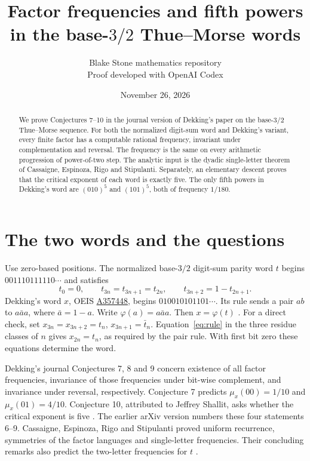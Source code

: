 \documentclass[11pt]{article}
\title{Factor frequencies and fifth powers in the base-$3/2$ Thue--Morse words}
\author{Blake Stone mathematics repository\\[-2pt]\small Proof developed with OpenAI Codex}
\date{November 26, 2026}
\begin{document}
\maketitle
\begin{abstract}
We prove Conjectures 7--10 in the journal version of Dekking's paper on the base-$3/2$
Thue--Morse sequence. For both the normalized digit-sum word and Dekking's variant, every
finite factor has a computable rational frequency, invariant under complementation and
reversal. The frequency is the same on every arithmetic progression of power-of-two step.
The analytic input is the dyadic single-letter theorem of Cassaigne, Espinoza, Rigo and
Stipulanti. Separately, an elementary descent proves that the critical exponent of each
word is exactly five. The only fifth powers in Dekking's word are $(010)^5$ and $(101)^5$,
both of frequency $1/180$.
\end{abstract}

\section{The two words and the questions}
Use zero-based positions. The normalized base-$3/2$ digit-sum parity word $t$ begins
$001110111110\cdots$ and satisfies
\begin{equation}
 t_0=0,\qquad t_{3n}=t_{3n+1}=t_{2n},\qquad t_{3n+2}=1-t_{2n+1}.\label{eq:rule}
\end{equation}
Dekking's word $x$, OEIS \href{https://oeis.org/A357448}{A357448}, begins
$010010101101\cdots$. Its rule sends a pair $ab$ to $a\bar a a$, where $\bar a=1-a$.
Write $\varphi(a)=a\bar a a$. Then $x=\varphi(t)$ \cite[Lemma 4]{cers}. For a direct check,
set $x_{3n}=x_{3n+2}=t_n$, $x_{3n+1}=\bar t_n$. Equation~\eqref{eq:rule} in the three
residue classes of $n$ gives $x_{2n}=t_n$, as required by the pair rule. With first bit
zero these equations determine the word.

Dekking's journal Conjectures 7, 8 and 9 concern existence of all factor frequencies,
invariance of those frequencies under bit-wise complement, and invariance under reversal,
respectively. Conjecture 7 predicts $\mu_x(00)=1/10$ and $\mu_x(01)=4/10$.
Conjecture 10, attributed to Jeffrey Shallit, asks whether the critical exponent is five
\cite[pp.~3--4]{dek}. The earlier arXiv version numbers these four statements 6--9.
Cassaigne, Espinoza, Rigo and Stipulanti proved uniform recurrence, symmetries of the
factor languages and single-letter frequencies. Their concluding remarks also predict
the two-letter frequencies for $t$ \cite[Sections 1.5 and 4]{cers}.
\end{document}
